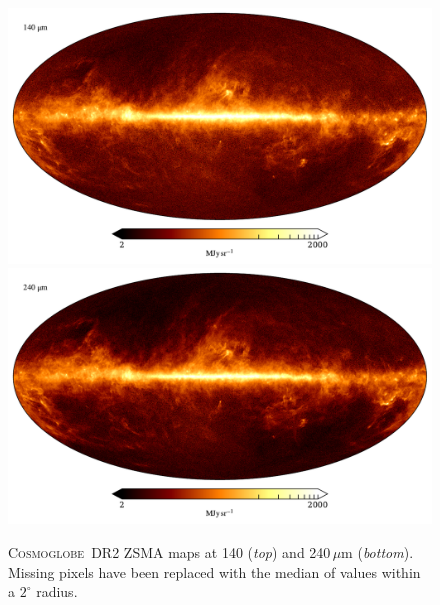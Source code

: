 \documentclass{aa}
\newcommand{\cosmoglobe}{\textsc{Cosmoglobe}}
\begin{document}
\begin{figure}
	\centering
	\includegraphics[width=\linewidth]{figs/map_09.pdf}\\
	\includegraphics[width=\linewidth]{figs/map_10.pdf}
	\caption{\cosmoglobe\ DR2 ZSMA maps at 140 (\emph{top}) and
          240$\,\mu$m (\emph{bottom}). Missing pixels have been replaced with
          the median of values within a $2^\circ$ radius.}
	\label{fig:freqmaps9_10}
\end{figure}


\end{document}
